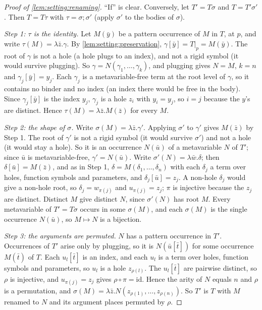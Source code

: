 \begin{proof}[Proof of \cref{lem:setting:renaming}]
``If'' is clear. Conversely, let $T'=T\sigma$ and $T=T'\sigma'$. Then $T=T\tau$ with $\tau=\sigma;\sigma'$ (apply $\sigma'$ to the bodies of $\sigma$).

\emph{Step 1: $\tau$ is the identity.} Let $M(\bar y)$ be a pattern occurrence of $M$ in $T$, at $p$, and write $\tau(M)=\lambda\bar z.\gamma$. By \cref{lem:setting:preservation}, $\gamma[\bar y]=T|_p=M(\bar y)$. The root of $\gamma$ is not a hole (a hole plugs to an index), and not a rigid symbol (it would survive plugging). So $\gamma=N(\gamma_1,\dots,\gamma_k)$, and plugging gives $N=M$, $k=n$ and $\gamma_j[\bar y]=y_j$. Each $\gamma_j$ is a metavariable-free term at the root level of $\gamma$, so it contains no binder and no index (an index there would be free in the body). Since $\gamma_j[\bar y]$ is the index $y_j$, $\gamma_j$ is a hole $z_i$ with $y_i=y_j$, so $i=j$ because the $y$'s are distinct. Hence $\tau(M)=\lambda\bar z.M(\bar z)$ for every $M$.

\emph{Step 2: the shape of $\sigma$.} Write $\sigma(M)=\lambda\bar z.\gamma'$. Applying $\sigma'$ to $\gamma'$ gives $M(\bar z)$ by Step 1. The root of $\gamma'$ is not a rigid symbol (it would survive $\sigma'$) and not a hole (it would stay a hole). So it is an occurrence $N(\bar u)$ of a metavariable $N$ of $T'$; since $\bar u$ is metavariable-free, $\gamma'=N(\bar u)$. Write $\sigma'(N)=\lambda\bar w.\delta$; then $\delta[\bar u]=M(\bar z)$, and as in Step 1, $\delta=M(\delta_1,\dots,\delta_n)$ with each $\delta_j$ a term over holes, function symbols and parameters, and $\delta_j[\bar u]=z_j$. A non-hole $\delta_j$ would give a non-hole root, so $\delta_j=w_{\pi(j)}$ and $u_{\pi(j)}=z_j$; $\pi$ is injective because the $z_j$ are distinct. Distinct $M$ give distinct $N$, since $\sigma'(N)$ has root $M$. Every metavariable of $T'=T\sigma$ occurs in some $\sigma(M)$, and each $\sigma(M)$ is the single occurrence $N(\bar u)$, so $M\mapsto N$ is a bijection.

\emph{Step 3: the arguments are permuted.} $N$ has a pattern occurrence in $T'$. Occurrences of $T'$ arise only by plugging, so it is $N(\bar u[\bar t])$ for some occurrence $M(\bar t)$ of $T$. Each $u_l[\bar t]$ is an index, and each $u_l$ is a term over holes, function symbols and parameters, so $u_l$ is a hole $z_{\rho(l)}$. The $u_l[\bar t]$ are pairwise distinct, so $\rho$ is injective, and $u_{\pi(j)}=z_j$ gives $\rho\circ\pi=\mathrm{id}$. Hence the arity of $N$ equals $n$ and $\rho$ is a permutation, and $\sigma(M)=\lambda\bar z.N(z_{\rho(1)},\dots,z_{\rho(n)})$. So $T'$ is $T$ with $M$ renamed to $N$ and its argument places permuted by $\rho$.
\end{proof}

